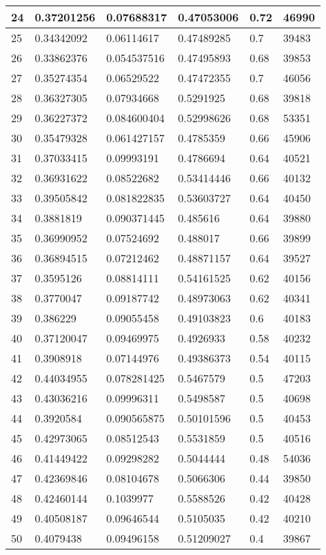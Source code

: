 \begin{longtable}{|l|l|l|l|l|l|}
24 & 0.37201256 & 0.07688317 & 0.47053006 & 0.72 & 46990 \\ \hline 
25 & 0.34342092 & 0.06114617 & 0.47489285 & 0.7 & 39483 \\ \hline 
26 & 0.33862376 & 0.054537516 & 0.47495893 & 0.68 & 39853 \\ \hline 
27 & 0.35274354 & 0.06529522 & 0.47472355 & 0.7 & 46056 \\ \hline 
28 & 0.36327305 & 0.07934668 & 0.5291925 & 0.68 & 39818 \\ \hline 
29 & 0.36227372 & 0.084600404 & 0.52998626 & 0.68 & 53351 \\ \hline 
30 & 0.35479328 & 0.061427157 & 0.4785359 & 0.66 & 45906 \\ \hline 
31 & 0.37033415 & 0.09993191 & 0.4786694 & 0.64 & 40521 \\ \hline 
32 & 0.36931622 & 0.08522682 & 0.53414446 & 0.66 & 40132 \\ \hline 
33 & 0.39505842 & 0.081822835 & 0.53603727 & 0.64 & 40450 \\ \hline 
34 & 0.3881819 & 0.090371445 & 0.485616 & 0.64 & 39880 \\ \hline 
35 & 0.36990952 & 0.07524692 & 0.488017 & 0.66 & 39899 \\ \hline 
36 & 0.36894515 & 0.07212462 & 0.48871157 & 0.64 & 39527 \\ \hline 
37 & 0.3595126 & 0.08814111 & 0.54161525 & 0.62 & 40156 \\ \hline 
38 & 0.3770047 & 0.09187742 & 0.48973063 & 0.62 & 40341 \\ \hline 
39 & 0.386229 & 0.09055458 & 0.49103823 & 0.6 & 40183 \\ \hline 
40 & 0.37120047 & 0.09469975 & 0.4926933 & 0.58 & 40232 \\ \hline 
41 & 0.3908918 & 0.07144976 & 0.49386373 & 0.54 & 40115 \\ \hline 
42 & 0.44034955 & 0.078281425 & 0.5467579 & 0.5 & 47203 \\ \hline 
43 & 0.43036216 & 0.09996311 & 0.5498587 & 0.5 & 40698 \\ \hline 
44 & 0.3920584 & 0.090565875 & 0.50101596 & 0.5 & 40453 \\ \hline 
45 & 0.42973065 & 0.08512543 & 0.5531859 & 0.5 & 40516 \\ \hline 
46 & 0.41449422 & 0.09298282 & 0.5044444 & 0.48 & 54036 \\ \hline 
47 & 0.42369846 & 0.08104678 & 0.5066306 & 0.44 & 39850 \\ \hline 
48 & 0.42460144 & 0.1039977 & 0.5588526 & 0.42 & 40428 \\ \hline 
49 & 0.40508187 & 0.09646544 & 0.5105035 & 0.42 & 40210 \\ \hline 
50 & 0.4079438 & 0.09496158 & 0.51209027 & 0.4 & 39867 \\ \hline 
\end{longtable}